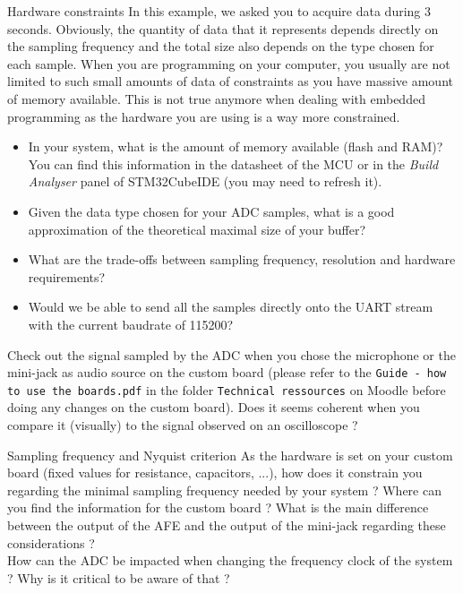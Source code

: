 \begin{bclogo}[couleur = gray!20, arrondi = 0.2, logo=\bcquestion]{Hardware constraints}
In this example, we asked you to acquire data during 3 seconds. Obviously, the quantity of data that it represents depends directly on the sampling frequency and the total size also depends on the type chosen for each sample. When you are programming on your computer, you usually are not limited to such small amounts of data of constraints as you have massive amount of memory available. This is not true anymore when dealing with embedded programming as the hardware you are using is a way more constrained.
\begin{itemize}
    \item In your system, what is the amount of memory available (flash and RAM)? You can find this information in the datasheet of the MCU or in the \textit{Build Analyser} panel of STM32CubeIDE (you may need to refresh it).
    \item Given the data type chosen for your ADC samples, what is a good approximation of the theoretical maximal size of your buffer?
    \item What are the trade-offs between sampling frequency, resolution and hardware requirements?
    \item Would we be able to send all the samples directly onto the UART stream with the current baudrate of 115200?
\end{itemize}

\end{bclogo}

\noindent Check out the signal sampled by the ADC when you chose the microphone or the mini-jack as audio source on the custom board (please refer to the \texttt{Guide - how to use the boards.pdf} in the folder \texttt{Technical ressources} on Moodle before doing any changes on the custom board). Does it seems coherent when you compare it (visually) to the signal observed on an oscilloscope ?

\begin{bclogo}[couleur = gray!20, arrondi = 0.2, logo=\bcquestion]{Sampling frequency and Nyquist criterion}
As the hardware is set on your custom board (fixed values for resistance, capacitors, ...), how does it constrain you regarding the minimal sampling frequency needed by your system ? Where can you find the information for the custom board ? What is the main difference between the output of the AFE and the output of the mini-jack regarding these considerations ? \\

\noindent How can the ADC be impacted when changing the frequency clock of the system ? Why is it critical to be aware of that ?
\end{bclogo}
